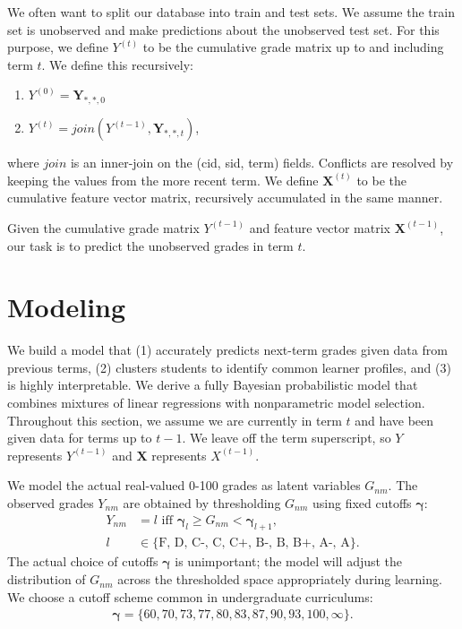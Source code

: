 \documentclass[10pt]{proc}
\begin{document}
We often want to split our database into train and test sets. We assume
the train set is unobserved and make predictions about the unobserved test set.
For this purpose, we define $Y^{(t)}$ to be the cumulative grade matrix up to
and including term $t$. We define this recursively:
%
\begin{enumerate}
    \item  $Y^{(0)} = \bm{Y}_{*,*,0}$
    \item  $Y^{(t)} = join(Y^{(t-1)}, \bm{Y}_{*,*,t})$,
\end{enumerate}
%
where $join$ is an inner-join on the (cid, sid, term) fields. Conflicts are
resolved by keeping the values from the more recent term. We define
$\bm{X}^{(t)}$ to be the cumulative feature vector matrix, recursively
accumulated in the same manner.

Given the cumulative grade matrix $Y^{(t-1)}$ and feature vector
matrix $\bm{X}^{(t-1)}$, our task is to predict the unobserved grades in term
$t$.

\section{Modeling}\label{model}

We build a model that (1) accurately predicts next-term grades given data from
previous terms, (2) clusters students to identify common learner profiles, and
(3) is highly interpretable. We derive a fully Bayesian probabilistic model that
combines mixtures of linear regressions with nonparametric model selection.
Throughout this section, we assume we are currently in term $t$ and have been
given data for terms up to $t-1$. We leave off the term superscript, so $Y$
represents $Y^{(t-1)}$ and $\bm{X}$ represents $X^{(t-1)}$.

We model the actual real-valued 0-100 grades as latent variables $G_{nm}$. The
observed grades $Y_{nm}$ are obtained by thresholding $G_{nm}$ using fixed
cutoffs $\bm{\gamma}$:
%
\begin{align}
    Y_{nm} &= l \text{ iff } \bm{\gamma}_l \ge G_{nm} < \bm{\gamma}_{l+1}, \\
         l &\in \{\text{F, D, C-, C, C+, B-, B, B+, A-, A} \}.
\end{align}
%
The actual choice of cutoffs $\bm{\gamma}$ is unimportant; the model will adjust
the distribution of $G_{nm}$ across the thresholded space appropriately during
learning. We choose a cutoff scheme common in undergraduate curriculums:
%
\begin{align}
    \bm{\gamma} = \{ 60, 70, 73, 77, 80, 83, 87, 90, 93, 100, \infty \}.
\end{align}
\end{document}
